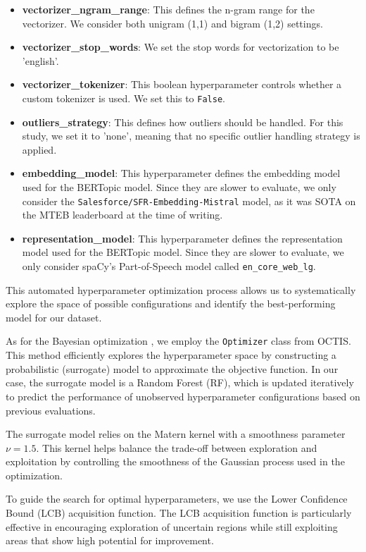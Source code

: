 \begin{itemize}
    \item \textbf{vectorizer\_ngram\_range}: This defines the n-gram range for the vectorizer. We consider both unigram (1,1) and bigram (1,2) settings.
    \item \textbf{vectorizer\_stop\_words}: We set the stop words for vectorization to be 'english'.
    \item \textbf{vectorizer\_tokenizer}: This boolean hyperparameter controls whether a custom tokenizer is used. We set this to \texttt{False}.
    \item \textbf{outliers\_strategy}: This defines how outliers should be handled. For this study, we set it to 'none', meaning that no specific outlier handling strategy is applied.
    \item \textbf{embedding\_model}: This hyperparameter defines the embedding model used for the BERTopic model. Since they are slower to evaluate, we only consider the \texttt{Salesforce/\allowbreak SFR-Embedding-\allowbreak Mistral} model, as it was SOTA on the MTEB leaderboard at the time of writing.
    \item \textbf{representation\_model}: This hyperparameter defines the representation model used for the BERTopic model. Since they are slower to evaluate, we only consider spaCy's Part-of-Speech model called \texttt{en\_core\_web\_lg}.
\end{itemize}

This automated hyperparameter optimization process allows us to systematically explore the space of possible configurations and identify the best-performing model for our dataset.

As for the Bayesian optimization \cite{archetti_bayesian_2019, galuzzi_hyperparameter_2020, snoek_practical_2012}, we employ the \texttt{Optimizer} class from OCTIS. This method efficiently explores the hyperparameter space by constructing a probabilistic (surrogate) model to approximate the objective function. In our case, the surrogate model is a Random Forest (RF), which is updated iteratively to predict the performance of unobserved hyperparameter configurations based on previous evaluations.

The surrogate model relies on the Matern kernel with a smoothness parameter \( \nu = 1.5 \). This kernel helps balance the trade-off between exploration and exploitation by controlling the smoothness of the Gaussian process used in the optimization.

To guide the search for optimal hyperparameters, we use the Lower Confidence Bound (LCB) acquisition function. The LCB acquisition function is particularly effective in encouraging exploration of uncertain regions while still exploiting areas that show high potential for improvement.

